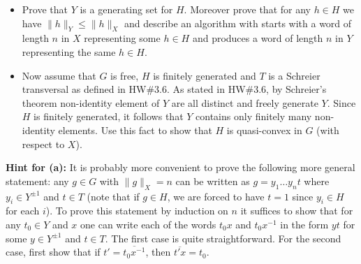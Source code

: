 \documentclass[12pt]{amsart}
\begin{document}
\begin{itemize}
\item[(a)] Prove that $Y$ is a generating set for $H$. Moreover prove that for any $h\in H$ we have $\|h\|_{Y}\leq \|h\|_{X}$
and describe an algorithm with starts with a word of length $n$ in $X$ representing some $h\in H$ and produces
a word of length $n$ in $Y$ representing the same $h\in H$.
\item[(b)] Now assume that $G$ is free, $H$ is finitely generated and $T$ is a Schreier transversal as defined in HW\#3.6.
As stated in HW\#3.6, by Schreier's theorem non-identity element of $Y$ are all distinct and freely generate $Y$. Since
$H$ is finitely generated, it follows that $Y$ contains only finitely many non-identity elements. Use this fact to show
that $H$ is quasi-convex in $G$ (with respect to $X$).
\end{itemize}
{\bf Hint for (a):} It is probably more convenient to prove the following more general statement: any $g\in G$ with
$\|g\|_X=n$ can be written as $g=y_1\ldots y_n t$ where $y_i\in Y^{\pm 1}$ and $t\in T$ (note that if $g\in H$,
we are forced to have $t=1$ since $y_i\in H$ for each $i$). To prove this statement by induction on $n$ it suffices to show that
for any $t_0\in Y$ and $x$ one can write each of the words $t_0 x$ and $t_0x^{-1}$ in the form $y t$ for some $y\in Y^{\pm 1}$
and $t\in T$. The first case is quite straightforward. For the second case, first show that if $t'=\overline{t_0x^{-1}}$,
then $\overline{t'x}=t_0$.
\end{document}
